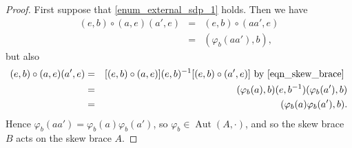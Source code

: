 \documentclass[10pt,a4paper]{amsart}
\DeclareMathOperator{\Aut}{\mbox{Aut}}
\begin{document}
\begin{proof}
First suppose that \ref{enum_external_sdp_1} holds. Then we have
\begin{eqnarray*}
(e,b) \circ (a,e)(a',e) & = & (e,b) \circ (aa',e) \\
& = & (\varphi_{b}(aa'),b), 
\end{eqnarray*}
but also
\begin{eqnarray*}
(e,b) \circ (a,e)(a',e) & = & [(e,b) \circ (a,e)] (e,b)^{-1} [(e,b) \circ (a',e)] \mbox{ by \eqref{eqn_skew_brace} } \\
& = & (\varphi_{b}(a),b)(e,b^{-1}) (\varphi_{b}(a'),b) \\
& = & (\varphi_{b}(a)\varphi_{b}(a'),b).
\end{eqnarray*}
Hence $ \varphi_{b}(aa') = \varphi_{b}(a)\varphi_{b}(a') $, so $ \varphi_{b} \in \Aut(A,\cdot) $, and so the skew brace $ B $ acts on the skew brace $ A $. 


\end{proof}
\end{document}
